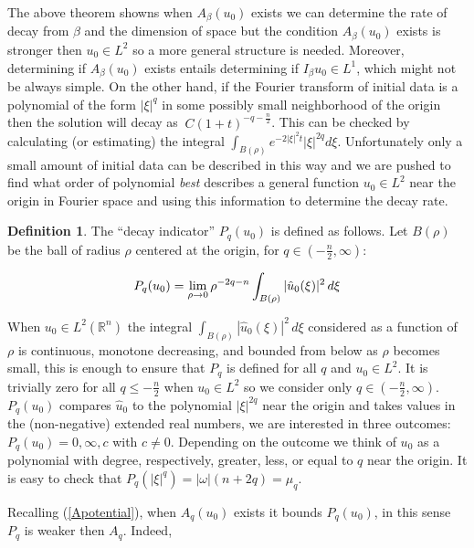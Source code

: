 \documentclass{amsart}
\numberwithin{Theorem}{section}
\numberwithin{equation}{section}
\theoremstyle{definition}
\newtheorem{Definition}[Theorem]{Definition}
\theoremstyle{remark}
\begin{document}
The above theorem showns when $A_\beta(u_0)$ exists we can determine the
rate of decay from $\beta$ and the dimension of space but the
condition $A_\beta(u_0)$ exists is stronger then $u_0\in L^2$ so a
more general structure is needed.  Moreover, determining if
$A_\beta(u_0)$ exists entails determining if $I_{\beta}u_0 \in L^1$,
which might not be always simple.  On the other hand, if the Fourier transform of
initial data is a polynomial of the form $|\xi|^q$ in some possibly
small neighborhood of the origin then the solution will decay as
$~C(1+t)^{-q-\frac{n}{2}}$.  This can be checked by calculating (or
estimating) the integral $\int_{B(\rho)}
e^{-2|\xi|^2t}|\xi|^{2q}d\xi$.  Unfortunately only a small amount of
initial data can be described in this way and we are pushed to find
what order of polynomial \emph{best} describes a general function
$u_0\in L^2$ near the origin in Fourier space and using this
information to determine the decay rate.

\begin{Definition}

The ``decay indicator'' $P_q(u_0)$ is defined as follows.  Let $B(\rho)$ be the ball of radius $\rho$ centered at the origin, for $q\in(-\frac{n}{2},\infty)$:

\begin{equation}
P_q(u_0) = \lim_{\rho\rightarrow 0}\rho^{-2q-n}\int_{B(\rho)}|\hat{u}_0(\xi)|^2\, d\xi\notag
\end{equation}

\end{Definition}

When $u_0\in L^2(\mathbb{R}^n)$ the integral $\int_{B(\rho)}|\hat{u}_0(\xi)|^2\, d\xi$ considered as a function of $\rho$ is continuous, monotone decreasing, and bounded from below as $\rho$ becomes small, this is enough to ensure that $P_q$ is defined for all $q$ and $u_0\in L^2$.  It is trivially zero for all $q\leq-\frac{n}{2}$ when $u_0\in L^2$ so we consider only $q\in (-\frac{n}{2},\infty)$.  $P_q(u_0)$ compares $\hat{u}_0$ to the polynomial $|\xi|^{2q}$ near the origin and takes values in the (non-negative) extended real numbers, we are interested in three outcomes: $P_q(u_0) = 0,\infty,c$ with $c\neq 0$.  Depending on the outcome we think of $u_0$ as a polynomial with degree, respectively, greater, less, or equal to $q$ near the origin.  It is easy to check that $P_q(|\xi|^q)=|\omega|(n+2q)=\mu_q$.

Recalling (\ref{Apotential}), when $A_q(u_0)$ exists it bounds $P_q(u_0)$, in this sense $P_q$ is weaker then $A_q$.  Indeed,
\end{document}
